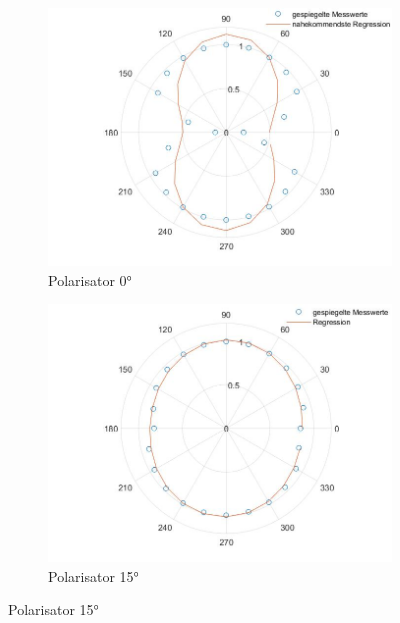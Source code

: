 \documentclass[a4paper, 12pt,]{scrartcl}
\begin{document}
\begin{figure}[H]\centering
\begin{adjustwidth}{-1em}{7em}
  \begin{subfigure}[b]{0.5\textwidth}
    \includegraphics[width=\textwidth]{Fit1}
    \caption{Polarisator 0°}
    \label{fig:}
  \end{subfigure}
  \begin{subfigure}[b]{0.5\textwidth}
    \includegraphics[width=\textwidth]{Fit2}
    \caption{Polarisator 15°}
    \label{fig:}
  \end{subfigure}
\end{adjustwidth}\centering
\begin{adjustwidth}{-1em}{7em}

\end{adjustwidth}
\end{figure}
\end{document}
